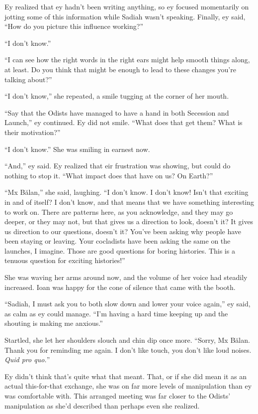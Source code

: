 Ey realized that ey hadn't been writing anything, so ey focused momentarily on jotting some of this information while Sadiah wasn't speaking. Finally, ey said, ``How do you picture this influence working?''

``I don't know.''

``I can see how the right words in the right ears might help smooth things along, at least. Do you think that might be enough to lead to these changes you're talking about?''

``I don't know,'' she repeated, a smile tugging at the corner of her mouth.

``Say that the Odists have managed to have a hand in both Secession and Launch,'' ey continued. Ey did not smile. ``What does that get them? What is their motivation?''

``I don't know.'' She was smiling in earnest now.

``And,'' ey said. Ey realized that eir frustration was showing, but could do nothing to stop it. ``What impact does that have on us? On Earth?''

``Mx Bălan,'' she said, laughing. ``I don't know. I don't know! Isn't that exciting in and of itself? I don't know, and that means that we have something interesting to work on. There are patterns here, as you acknowledge, and they may go deeper, or they may not, but that gives us a direction to look, doesn't it? It gives us direction to our questions, doesn't it? You've been asking why people have been staying or leaving. Your cocladists have been asking the same on the launches, I imagine. Those are good questions for boring histories. This is a tenuous question for exciting histories!''

She was waving her arms around now, and the volume of her voice had steadily increased. Ioan was happy for the cone of silence that came with the booth.

``Sadiah, I must ask you to both slow down and lower your voice again,'' ey said, as calm as ey could manage. ``I'm having a hard time keeping up and the shouting is making me anxious.''

Startled, she let her shoulders slouch and chin dip once more. ``Sorry, Mx Bălan. Thank you for reminding me again. I don't like touch, you don't like loud noises. \emph{Quid pro quo.}''

Ey didn't think that's quite what that meant. That, or if she did mean it as an actual this-for-that exchange, she was on far more levels of manipulation than ey was comfortable with. This arranged meeting was far closer to the Odists' manipulation as she'd described than perhaps even she realized.

